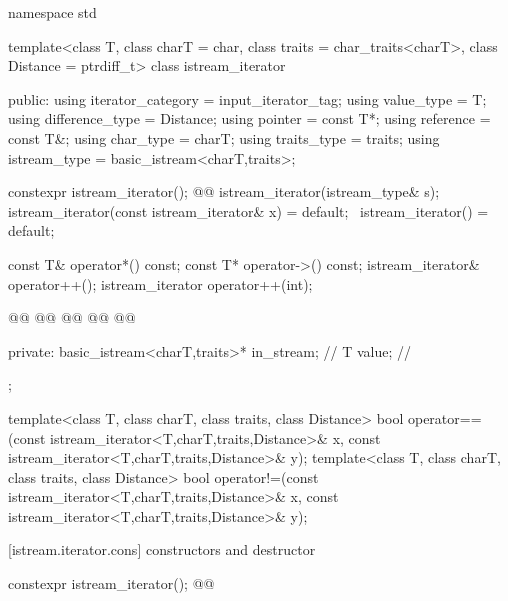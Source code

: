 \begin{codeblock}
namespace std {
  template<class T, class charT = char, class traits = char_traits<charT>,
           class Distance = ptrdiff_t>
  class istream_iterator {
  public:
    using iterator_category = input_iterator_tag;
    using value_type        = T;
    using difference_type   = Distance;
    using pointer           = const T*;
    using reference         = const T&;
    using char_type         = charT;
    using traits_type       = traits;
    using istream_type      = basic_istream<charT,traits>;

    constexpr istream_iterator();
    @@
    istream_iterator(istream_type& s);
    istream_iterator(const istream_iterator& x) = default;
    ~istream_iterator() = default;

    const T& operator*() const;
    const T* operator->() const;
    istream_iterator& operator++();
    istream_iterator  operator++(int);

    @@
    @@
    @@
    @@
    @@

  private:
    basic_istream<charT,traits>* in_stream; // \expos
    T value;                                // \expos
  };

  template<class T, class charT, class traits, class Distance>
    bool operator==(const istream_iterator<T,charT,traits,Distance>& x,
            const istream_iterator<T,charT,traits,Distance>& y);
  template<class T, class charT, class traits, class Distance>
    bool operator!=(const istream_iterator<T,charT,traits,Distance>& x,
            const istream_iterator<T,charT,traits,Distance>& y);
}
\end{codeblock}

[istream.iterator.cons]{ constructors and destructor}


%
\begin{itemdecl}
constexpr istream_iterator();
@@
\end{itemdecl}

